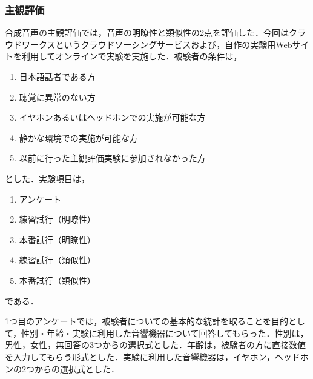 \subsubsection{主観評価}
\label{sec4:sec:sbj_explanation}
合成音声の主観評価では，音声の明瞭性と類似性の2点を評価した．今回はクラウドワークスというクラウドソーシングサービスおよび，自作の実験用Webサイトを利用してオンラインで実験を実施した．被験者の条件は，
\begin{enumerate}
    \item 日本語話者である方
    \item 聴覚に異常のない方
    \item イヤホンあるいはヘッドホンでの実施が可能な方
    \item 静かな環境での実施が可能な方
    \item 以前に行った主観評価実験に参加されなかった方
\end{enumerate}
とした．実験項目は，
\begin{enumerate}
    \item アンケート
    \item 練習試行（明瞭性）
    \item 本番試行（明瞭性）
    \item 練習試行（類似性）
    \item 本番試行（類似性）
\end{enumerate}
である．

1つ目のアンケートでは，被験者についての基本的な統計を取ることを目的として，性別・年齢・実験に利用した音響機器について回答してもらった．性別は，男性，女性，無回答の3つからの選択式とした．年齢は，被験者の方に直接数値を入力してもらう形式とした．実験に利用した音響機器は，イヤホン，ヘッドホンの2つからの選択式とした．

